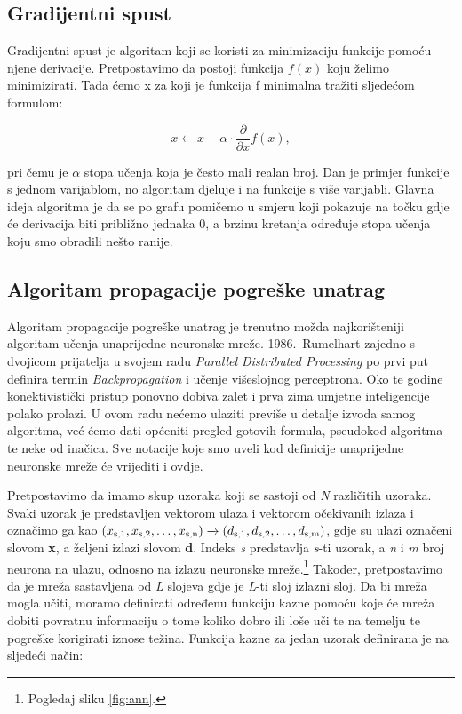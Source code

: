 \documentclass[times, utf8, zavrsni]{fer}
\begin{document}
\subsection{Gradijentni spust}
Gradijentni spust  je algoritam koji se koristi za minimizaciju funkcije pomoću njene derivacije. Pretpostavimo da postoji funkcija $f(x)$ koju želimo minimizirati. Tada ćemo x za koji je funkcija f minimalna tražiti sljedećom formulom:

\begin{equation}
    \label{eq:grad}
    x \leftarrow x - \alpha \cdot{\frac{\partial}{\partial x}}f(x),
\end{equation}

pri čemu je $\alpha$ stopa učenja koja je često mali realan broj. Dan je primjer funkcije s jednom varijablom, no algoritam djeluje i na funkcije s više varijabli. Glavna ideja algoritma je da se po grafu pomičemo u smjeru koji pokazuje na točku gdje će derivacija biti približno jednaka 0, a brzinu kretanja određuje stopa učenja koju smo obradili nešto ranije.

\subsection{Algoritam propagacije pogreške unatrag}
Algoritam propagacije pogreške unatrag  je trenutno možda najkorišteniji algoritam učenja unaprijedne neuronske mreže. 1986.\ Rumelhart zajedno s dvojicom prijatelja u svojem radu \textit{Parallel Distributed Processing} po prvi put definira termin \textit{Backpropagation} i učenje višeslojnog perceptrona. Oko te godine konektivistički pristup ponovno dobiva zalet i prva zima umjetne inteligencije polako prolazi. U ovom radu nećemo ulaziti previše u detalje izvoda samog algoritma, već ćemo dati općeniti pregled gotovih formula, pseudokod algoritma te neke od inačica. Sve notacije koje smo uveli kod definicije unaprijedne neuronske mreže će vrijediti i ovdje.

Pretpostavimo da imamo skup uzoraka koji se sastoji od \textit{N} različitih uzoraka. Svaki uzorak je predstavljen vektorom ulaza i vektorom očekivanih izlaza i označimo ga kao $(x\textsubscript{s,1}, x\textsubscript{s,2},\dots, x\textsubscript{s,n}) \xrightarrow{} (d\textsubscript{s,1}, d\textsubscript{s,2},\dots, d\textsubscript{s,m})$, gdje su ulazi označeni slovom \textbf{x}, a željeni izlazi slovom \textbf{d}. Indeks \textit{s} predstavlja \textit{s}-ti uzorak, a \textit{n} i \textit{m} broj neurona na ulazu, odnosno na izlazu neuronske mreže.\footnote{Pogledaj sliku \ref{fig:ann}.} Također, pretpostavimo da je mreža sastavljena od \textit{L} slojeva gdje je \textit{L}-ti sloj izlazni sloj. Da bi mreža mogla učiti, moramo definirati određenu funkciju kazne pomoću koje će mreža dobiti povratnu informaciju o tome koliko dobro ili loše uči te na temelju te pogreške korigirati iznose težina. Funkcija kazne za jedan uzorak definirana je na sljedeći način:
\end{document}
